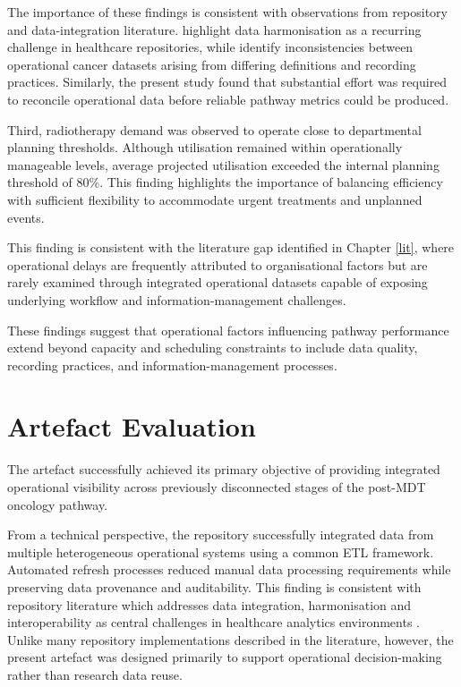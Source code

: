 The importance of these findings is consistent with observations from repository and data-integration literature. \cite{gagalova2020} highlight data harmonisation as a recurring challenge in healthcare repositories, while \cite{varma2026} identify inconsistencies between operational cancer datasets arising from differing definitions and recording practices. Similarly, the present study found that substantial effort was required to reconcile operational data before reliable pathway metrics could be produced.

Third, radiotherapy demand was observed to operate close to departmental planning thresholds. Although utilisation remained within operationally manageable levels, average projected utilisation exceeded the internal planning threshold of 80\%. This finding highlights the importance of balancing efficiency with sufficient flexibility to accommodate urgent treatments and unplanned events.

This finding is consistent with the literature gap identified in Chapter \ref{lit}, where operational delays are frequently attributed to organisational factors but are rarely examined through integrated operational datasets capable of exposing underlying workflow and information-management challenges.

These findings suggest that operational factors influencing pathway performance extend beyond capacity and scheduling constraints to include data quality, recording practices, and information-management processes.

\section{Artefact Evaluation}
The artefact successfully achieved its primary objective of providing integrated operational visibility across previously disconnected stages of the post-MDT oncology pathway. 

From a technical perspective, the repository successfully integrated data from multiple heterogeneous operational systems using a common ETL framework. Automated refresh processes reduced manual data processing requirements while preserving data provenance and auditability. This finding is consistent with repository literature which addresses data integration, harmonisation and interoperability as central challenges in healthcare analytics environments \citep{gagalova2020, guilbert2024}. Unlike many repository implementations described in the literature, however, the present artefact was designed primarily to support operational decision-making rather than research data reuse. 

